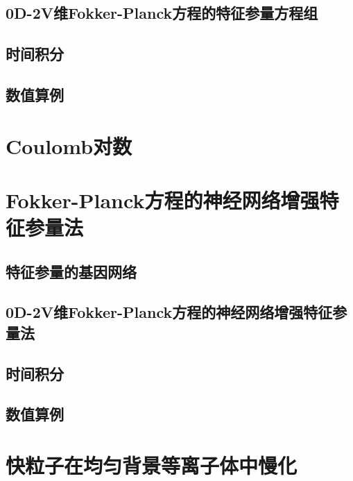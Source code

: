 \section{0D-2V维Fokker-Planck方程的特征参量方程组}
\label{0D-2V维Fokker-Planck方程的特征参量方程组}

\section{时间积分}
\label{特征参量时间积分}

\section{数值算例}
\label{特征参量法数值算例}


\chapter{Coulomb对数}
\label{Coulomb对数}

\chapter{Fokker-Planck方程的神经网络增强特征参量法}
\label{Fokker-Planck方程的神经网络增强特征参量法}

\section{特征参量的基因网络}
\label{特征参量的基因网络}

\section{0D-2V维Fokker-Planck方程的神经网络增强特征参量法}
\label{0D-2V维Fokker-Planck方程的神经网络增强特征参量法}

\section{时间积分}
\label{神经网络增强特征参量法时间积分}

\section{数值算例}
\label{神经网络增强特征参量法数值算例}





\chapter{快粒子在均匀背景等离子体中慢化}
\label{快粒子在均匀背景等离子体中慢化}


